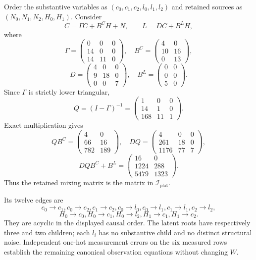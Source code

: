 Order the substantive variables as \((c_0,c_1,c_2,l_0,l_1,l_2)\) and retained sources as \((N_0,N_1,N_2,H_0,H_1)\). Consider
\[
C=\Gamma C+B^CH+N,\qquad L=DC+B^LH,
\]
where
\[
\Gamma=\begin{pmatrix}0&0&0\\14&0&0\\14&11&0\end{pmatrix},
\quad B^C=\begin{pmatrix}4&0\\10&16\\0&13\end{pmatrix},
\]
\[
D=\begin{pmatrix}4&0&0\\9&18&0\\0&0&7\end{pmatrix},
\quad B^L=\begin{pmatrix}0&0\\0&0\\5&0\end{pmatrix}.
\]
Since \(\Gamma\) is strictly lower triangular,
\[
Q=(I-\Gamma)^{-1}=\begin{pmatrix}1&0&0\\14&1&0\\168&11&1\end{pmatrix}.
\]
Exact multiplication gives
\[
QB^C=\begin{pmatrix}4&0\\66&16\\782&189\end{pmatrix},
\quad DQ=\begin{pmatrix}4&0&0\\261&18&0\\1176&77&7\end{pmatrix},
\]
\[
DQB^C+B^L=\begin{pmatrix}16&0\\1224&288\\5479&1323\end{pmatrix}.
\]
Thus the retained mixing matrix is the matrix in \(\mathcal I_{\mathrm{plat}}\).

Its twelve edges are
\[
c_0\to c_1, c_0\to c_2, c_1\to c_2, c_0\to l_0, c_0\to l_1, c_1\to l_1, c_2\to l_2,
\]
\[
H_0\to c_0, H_0\to c_1, H_0\to l_2, H_1\to c_1, H_1\to c_2.
\]
They are acyclic in the displayed causal order. The latent roots have respectively three and two children; each \(l_i\) has no substantive child and no distinct structural noise. Independent one-hot measurement errors on the six measured rows establish the remaining canonical observation equations without changing \(W\).

